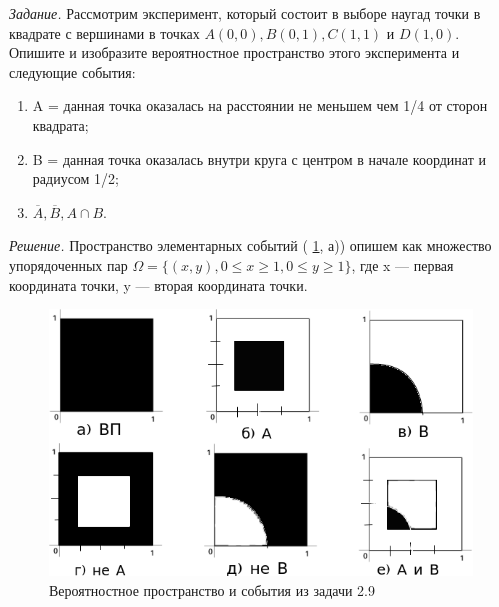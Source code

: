 \textit{Задание.} Рассмотрим эксперимент, который состоит в выборе наугад точки в квадрате с вершинами в точках $ A(0, 0), B(0, 1), C(1, 1) $ и $ D(1, 0) $.
Опишите и изобразите вероятностное пространство этого эксперимента и следующие события:
\begin{enumerate}[label=\alph*)]
\item A = {данная точка оказалась на расстоянии не меньшем чем 1/4 от сторон квадрата};
\item B = {данная точка оказалась внутри круга с центром в начале координат и радиусом 1/2};
\item $ \overline{ A }, \overline{ B }, A \cap B $.
\end{enumerate}

\textit{Решение.} Пространство элементарных событий ( \ref{fig:29}, а)) опишем как множество упорядоченных пар
$ \Omega = \{ (x, y), 0 \leq x \geq 1, 0 \leq y \geq 1 \} $, где x --- первая координата точки, y --- вторая координата точки.

\begin{figure}[h!]
  \centering
  \includegraphics[width=.7\textwidth]{./pictures/2_9.png}
  \caption{Вероятностное пространство и события из задачи 2.9}
  \label{fig:29}
\end{figure}


